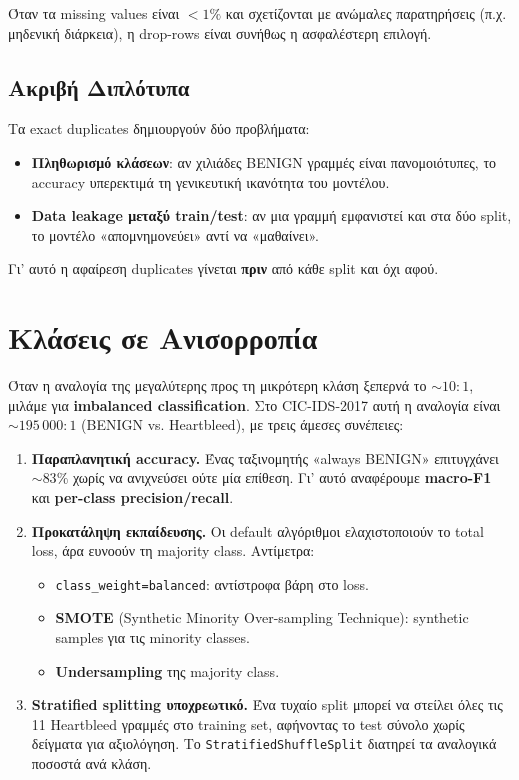 \documentclass[12pt,a4paper,twoside]{book}
\begin{document}
Όταν τα missing values είναι \(<1\%\) και σχετίζονται με ανώμαλες
παρατηρήσεις (π.χ. μηδενική διάρκεια), η drop-rows είναι συνήθως η
ασφαλέστερη επιλογή.

\subsection{Ακριβή Διπλότυπα}

Τα exact duplicates δημιουργούν δύο προβλήματα:
\begin{itemize}
    \item \textbf{Πληθωρισμό κλάσεων}: αν χιλιάδες BENIGN γραμμές είναι
    πανομοιότυπες, το accuracy υπερεκτιμά τη γενικευτική ικανότητα του
    μοντέλου.
    \item \textbf{Data leakage μεταξύ train/test}: αν μια γραμμή εμφανιστεί
    και στα δύο split, το μοντέλο «απομνημονεύει» αντί να «μαθαίνει».
\end{itemize}

Γι' αυτό η αφαίρεση duplicates γίνεται \textbf{πριν} από κάθε split και
όχι αφού.

\section{Κλάσεις σε Ανισορροπία}

Όταν η αναλογία της μεγαλύτερης προς τη μικρότερη κλάση ξεπερνά το
\(\sim 10:1\), μιλάμε για \textbf{imbalanced classification}. Στο
CIC-IDS-2017 αυτή η αναλογία είναι \(\sim 195\,000:1\) (BENIGN vs.
Heartbleed), με τρεις άμεσες συνέπειες:

\begin{enumerate}
    \item \textbf{Παραπλανητική accuracy.} Ένας ταξινομητής «always
    BENIGN» επιτυγχάνει \(\sim 83\%\) χωρίς να ανιχνεύσει ούτε μία επίθεση.
    Γι' αυτό αναφέρουμε \textbf{macro-F1} και \textbf{per-class precision/recall}.

    \item \textbf{Προκατάληψη εκπαίδευσης.} Οι default αλγόριθμοι
    ελαχιστοποιούν το total loss, άρα ευνοούν τη majority class. Αντίμετρα:
    \begin{itemize}
        \item \texttt{class\_weight=\textquotesingle balanced\textquotesingle}: αντίστροφα βάρη
        στο loss.
        \item \textbf{SMOTE} (Synthetic Minority Over-sampling Technique):
        synthetic samples για τις minority classes.
        \item \textbf{Undersampling} της majority class.
    \end{itemize}

    \item \textbf{Stratified splitting υποχρεωτικό.} Ένα τυχαίο split
    μπορεί να στείλει όλες τις 11 Heartbleed γραμμές στο training set,
    αφήνοντας το test σύνολο χωρίς δείγματα για αξιολόγηση. Το \newline
    \texttt{StratifiedShuffleSplit} διατηρεί τα αναλογικά ποσοστά ανά κλάση.
\end{enumerate}
\end{document}
